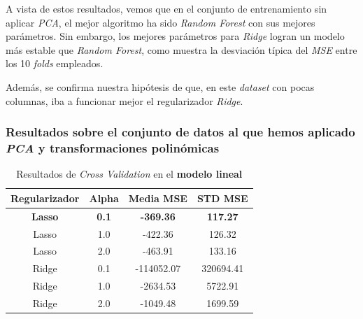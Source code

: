 \documentclass[11pt]{article}
\begin{document}
\begin{table}[H]
  \centering
  \caption{Mejores resultados}
\end{table}

A vista de estos resultados, vemos que en el conjunto de entrenamiento sin aplicar \emph{PCA}, el mejor algoritmo ha sido \emph{Random Forest} con sus mejores parámetros. Sin embargo, los mejores parámetros para \emph{Ridge} logran un modelo más estable que \emph{Random Forest}, como muestra la desviación típica del \emph{MSE} entre los 10 \emph{folds} empleados.

Además, se confirma nuestra hipótesis de que, en este \emph{dataset} con pocas columnas, iba a funcionar mejor el regularizador \emph{Ridge}.

\subsubsection{Resultados sobre el conjunto de datos al que hemos aplicado \emph{PCA} y transformaciones polinómicas}

\begin{table}[H]
  \centering
  \begin{tabular}{|c|c|c|c|}
  \hline
    \textbf{Regularizador} & \textbf{Alpha} & \textbf{Media MSE} & \textbf{STD MSE} \\
    \hline
    \textbf{Lasso} & \textbf{0.1} & \textbf{-369.36} & \textbf{117.27}  \\
    Lasso & 1.0 & -422.36 & 126.32  \\
    Lasso & 2.0 & -463.91 & 133.16  \\
    Ridge & 0.1 & -114052.07 & 320694.41 \\
    Ridge & 1.0 & -2634.53   &   5722.91 \\
    Ridge & 2.0 & -1049.48   &   1699.59 \\
    \hline
  \end{tabular}
  \caption{Resultados de \emph{Cross Validation} en el \textbf{modelo lineal}}
\end{table}
\end{document}
